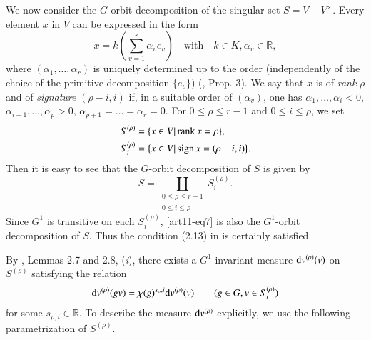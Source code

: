 \section{}\label{art11-sec3}
We now consider the $G$-orbit decomposition of the singular set $S=V-V^{\times}$. Every element $x$ in $V$ can be expressed in the form
\begin{equation}
x=k\left(\sum\limits^{r}_{v=1}\alpha_{v}e_{v}\right)\quad\text{with}\quad k\in K, \alpha_{v}\in \mathbb{R},\label{art11-eq6}
\end{equation}
where $(\alpha_{1},\ldots,\alpha_{r})$ is uniquely determined up to the order (independently of the choice of the primitive decomposition $\{e_{v}\}$) (\cite{art11-keyS3}, Prop. 3). We say that $x$ is of {\em rank} $\rho$ and of {\em signature} $(\rho-i,i)$ if, in a suitable order of $(\alpha_{v})$, one has $\alpha_{1},\ldots,\alpha_{i}<0$, $\alpha_{i+1},\ldots,\alpha_{p}>0$, $\alpha_{\rho+1}=\ldots=\alpha_{r}=0$. For $0\leq\rho \leq r-1$ and $0\leq i\leq \rho$, we set
\begin{align*}
& S^{(\rho)}=\{x\in V|\operatorname{rank} x=\rho\},\\
& S^{(\rho)}_{i}=\{x\in V|\operatorname{sign} x=(\rho-i,i)\}.
\end{align*}
Then it is easy to see that the $G$-orbit decomposition of $S$ is given by 
\begin{equation}
S=\coprod\limits_{\substack{0\leq \rho \leq r-1\\ 0\leq i\leq \rho}}S^{(\rho)}_{i}.\label{art11-eq7}
\end{equation}
Since $G^{1}$ is transitive on each $S^{(\rho)}_{i}$, \eqref{art11-eq7} is also the $G^{1}$-orbit decomposition of $S$. Thus the condition (2.13) in \cite{art11-keySS} is certainly satisfied.

By \cite{art11-keySS}, Lemmas 2.7 and 2.8, ({\em i}), there exists a $G^{1}$-invariant measure $\mathrm{d} v^{(\rho)}(v)$ on $S^{(\rho)}$ satisfying the relation
\begin{equation}
\mathrm{d} v^{(\rho)}(gv)=\chi(g)^{s_{\rho},i}\mathrm{d} v^{(\rho)}(v)\qquad (g\in G, v\in S^{(\rho)}_{i})\label{art11-eq8}
\end{equation}
for some $s_{\rho,i}\in \mathbb{R}$. To describe the measure $\mathrm{d} v^{(\rho)}$ explicitly, we use the following parametrization of $S^{(\rho)}$.

